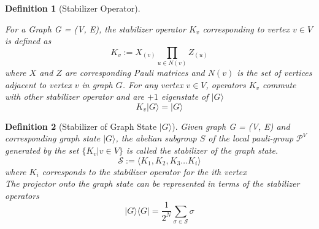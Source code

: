 \documentclass{article}
\newtheorem{definition}{Definition}
\newcommand{\ket}[1]{|#1\rangle}
\newcommand{\bra}[1]{\langle #1|}
\begin{document}
\begin{definition} [Stabilizer Operator] \label{def:stabilzer_operator}
    
For a Graph G = (V, E), the stabilizer operator $ K_v $ corresponding to vertex $ v \in V $ is defined as 
\begin{equation}
\label{eq:stabilzer_operator}
    K_v := X_{(v)} \prod_{u \in N(v)} Z_{(u)}
\end{equation}
where $X$ and $Z$ are corresponding Pauli matrices and $N(v)$ is the set of vertices adjacent to vertex $v$ in graph $G$. 
For any vertex $v \in V$, operators $K_v$ commute with other stabilizer operator and are $+1$ eigenstate of $\ket{G}$
\begin{equation}
\label{eq:graph_state_eigenvector_of_stabilzer_operator}
    K_v \ket{G} = \ket{G}
\end{equation}
\end{definition}
\begin{definition} [Stabilizer of Graph State $\ket{G}$] \label{def:stabilizer_of_graph_state}
Given graph G = (V, E) and corresponding graph state $\ket{G}$, the abelian subgroup $S$ of the local pauli-group $\mathcal{P}^{V}$ generated by the set $\{K_v| v \in V\}$ is called the stabilizer of the graph state.
\begin{equation}
\label{eq:stabilizer_of_graph_state}
    \mathcal{S} := \langle K_1, K_2, K_3 \dots K_i \rangle
\end{equation}
where $K_i$ corresponds to the stabilizer operator for the ith vertex
\\
The projector onto the graph state can be represented in terms of the stabilizer operators
\begin{equation}
\label{eq:graph_state_in_terms_of_stabilizer_operators}
    \ket{G}\bra{G} = \frac{1}{2^N} \sum_{\sigma \in \mathcal{S}} \sigma
\end{equation}
    
\end{definition}
\end{document}
